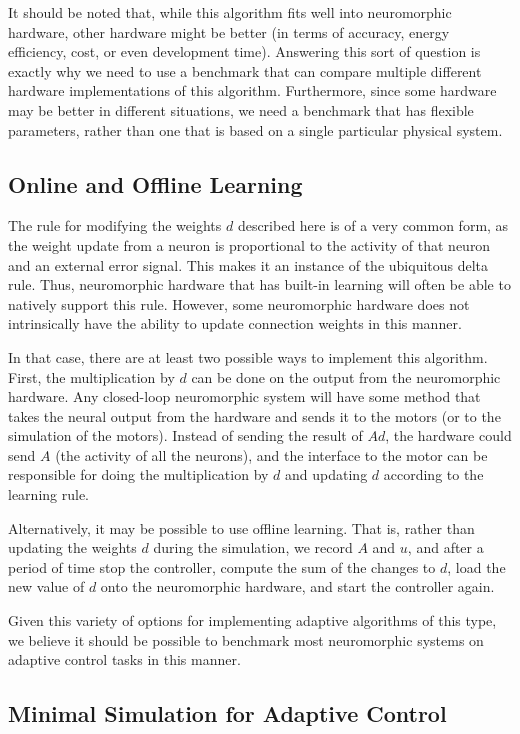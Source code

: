 \documentclass{frontiersSCNS} %
\begin{document}
It should be noted that, while this algorithm fits well into neuromorphic
hardware, other hardware might be better (in terms of 
accuracy, energy efficiency, cost, or even development time).  Answering
this sort of question is exactly why we need to use a benchmark that can
compare multiple different hardware implementations of this algorithm.  
Furthermore, since some hardware may be better in different situations,
we need a benchmark that has flexible parameters, rather than one that is
based on a single particular physical system.


\subsection{Online and Offline Learning}

The rule for modifying the weights $d$ described here is
of a very common form, as the weight
update from a neuron is proportional to the activity of that neuron and an
external error signal.  This makes it an instance of the ubiquitous delta rule.
Thus, neuromorphic hardware that has built-in learning will often be able to natively support this rule.
However, some neuromorphic hardware does not intrinsically have
the ability to update connection weights in this manner.

In that case, there are at least two possible ways to implement this algorithm.
First, the multiplication by $d$ can be done on the
output from the neuromorphic hardware.  Any closed-loop neuromorphic system will have some method that takes
the neural output from the hardware and sends it to the motors (or to the simulation
of the motors).  Instead of sending the result of $Ad$, the hardware could
send $A$ (the activity of all the neurons), and the interface to the motor
can be responsible for doing the multiplication by $d$ and updating $d$
according to the learning rule.

Alternatively, it may be possible to use offline learning.  That is, rather than updating
the weights $d$ during the simulation, we record $A$ and $u$, and after
a period of time stop the controller, compute the sum of the changes
to $d$, load the new value of $d$ onto the neuromorphic hardware, and
start the controller again.

Given this variety of options for implementing adaptive algorithms of this type, 
we believe it should be possible to benchmark most neuromorphic systems on 
adaptive control tasks in this manner.

\subsection{Minimal Simulation for Adaptive Control}
\end{document}
